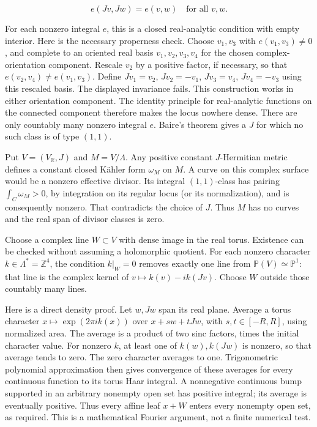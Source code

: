 \documentclass[11pt]{article}
\begin{document}
\[e(Jv,Jw)=e(v,w)\quad\text{for all }v,w.\]

For each nonzero integral $e$, this is a closed real-\allowbreak{}analytic condition with empty interior. Here is the necessary properness check. Choose $v_1,v_3$ with $e(v_1,v_3)\ne0$, and complete to an oriented real basis $v_1,v_2,v_3,v_4$ for the chosen complex-\allowbreak{}orientation component. Rescale $v_2$ by a positive factor, if necessary, so that $e(v_2,v_4)\ne e(v_1,v_3)$. Define $Jv_1=v_2$, $Jv_2=-v_1$, $Jv_3=v_4$, $Jv_4=-v_3$ using this rescaled basis. The displayed invariance fails. This construction works in either orientation component. The identity principle for real-\allowbreak{}analytic functions on the connected component therefore makes the locus nowhere dense. There are only countably many nonzero integral $e$. Baire's theorem gives a $J$ for which no such class is of type $(1,1)$.

Put $V=(V_{\mathbb R},J)$ and $M=V/\Lambda$. Any positive constant $J$-\allowbreak{}Hermitian metric defines a constant closed Kähler form $\omega_M$ on $M$. A curve on this complex surface would be a nonzero effective divisor. Its integral $(1,1)$-\allowbreak{}class has pairing $\int_C\omega_M>0$, by integration on its regular locus (or its normalization), and is consequently nonzero. That contradicts the choice of $J$. Thus $M$ has no curves and the real span of divisor classes is zero.

Choose a complex line $W\subset V$ with dense image in the real torus. Existence can be checked without assuming a holomorphic quotient. For each nonzero character $k\in\Lambda^*=\mathbb Z^4$, the condition $k|_W=0$ removes exactly one line from $\mathbb P(V)\simeq\mathbb P^1$: that line is the complex kernel of $v\mapsto k(v)-i k(Jv)$. Choose $W$ outside those countably many lines.

Here is a direct density proof. Let $w,Jw$ span its real plane. Average a torus character $x\mapsto\exp(2\pi i k(x))$ over $x+sw+tJw$, with $s,t\in[-R,R]$, using normalized area. The average is a product of two sinc factors, times the initial character value. For nonzero $k$, at least one of $k(w),k(Jw)$ is nonzero, so that average tends to zero. The zero character averages to one. Trigonometric polynomial approximation then gives convergence of these averages for every continuous function to its torus Haar integral. A nonnegative continuous bump supported in an arbitrary nonempty open set has positive integral; its average is eventually positive. Thus every affine leaf $x+W$ enters every nonempty open set, as required. This is a mathematical Fourier argument, not a finite numerical test.
\end{document}
